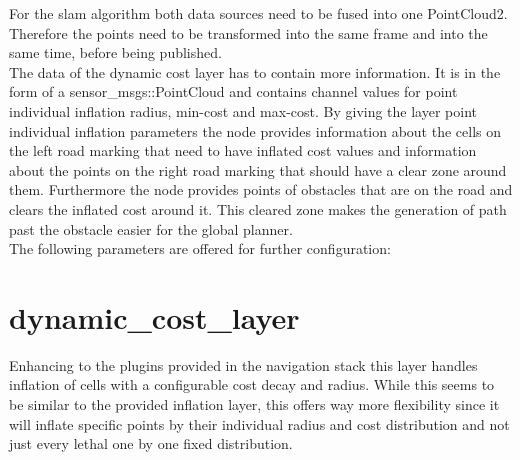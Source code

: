 For the slam algorithm both data sources need to be fused into one PointCloud2. Therefore the points need to be transformed into the same frame and into the same time, before being published.\\

The data of the dynamic cost layer has to contain more information. It is in the form of a sensor\_msgs::PointCloud and contains channel values for point individual inflation radius, min-cost and max-cost. By giving the layer point individual inflation parameters the node provides information about the cells on the left road marking that need to have inflated cost values and information about the points on the right road marking that should have a clear zone around them. Furthermore the node provides points of obstacles that are on the road and clears the inflated cost around it. This cleared zone makes the generation of path past the obstacle easier for the global planner.\\

The following parameters are offered for further configuration:

\begin{table}[H]
\centering
{}

\caption{MarkeFreeSpace parameters}
\label{markfreespaceparams}
\end{table}

\section{dynamic\_cost\_layer}
Enhancing to the plugins provided in the navigation stack this layer handles inflation of cells with a configurable cost decay and radius. While this seems to be similar to the provided inflation layer, this offers way more flexibility since it will inflate specific points by their individual radius and cost distribution and not just every lethal one by one fixed distribution.\\

